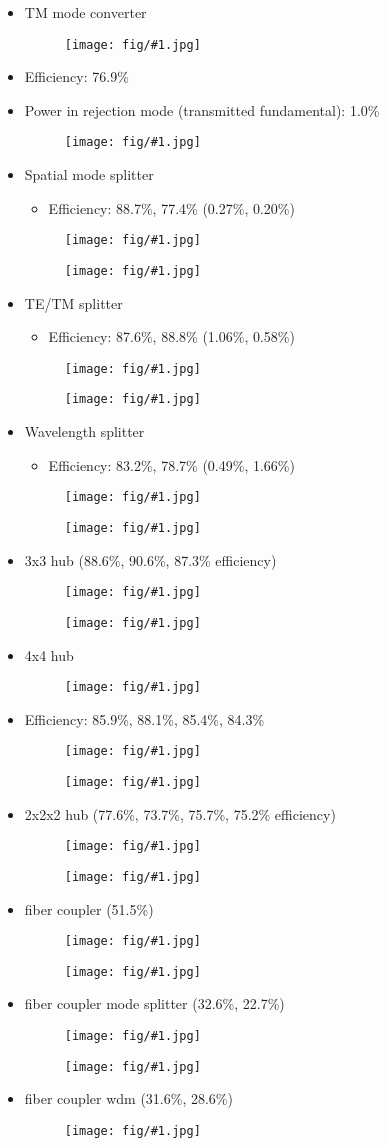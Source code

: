\documentclass[landscape]{foils}
\newcommand{\nextpage}{\vfill\newpage}
\newcommand{\smallfig}[1]{
    \begin{figure}[!h]
    \centerline{\texttt{[image: fig/\#1.jpg]}}
    \end{figure}
}
\newcommand{\medfig}[1]{
    \begin{figure}[!h]
    \centerline{\texttt{[image: fig/\#1.jpg]}}
    \end{figure}
}
\newcommand{\bigfig}[1]{
    \begin{figure}[!h]
    \centerline{\texttt{[image: fig/\#1.jpg]}}
    \end{figure}
}
\newcommand{\BI}{\begin{itemize}\item}
\newcommand{\I}{\item}
\newcommand{\EI}{\end{itemize}}
\begin{document}
\begin{itemize}
\I TM mode converter
\smallfig{wgc_tm}
\I  Efficiency: 76.9\%
\I  Power in rejection mode (transmitted fundamental): 1.0\%
\newpage

\medfig{3D_spl_modal}
\nextpage

\I  Spatial mode splitter
\BI  Efficiency: 88.7\%, 77.4\% (0.27\%, 0.20\%) \EI
\medfig{spl_modal}
\newpage

\medfig{3D_spl_tetm}
\nextpage

\I  TE/TM splitter
\BI  Efficiency: 87.6\%, 88.8\% (1.06\%, 0.58\%) \EI
\medfig{spl_tetm}
\newpage

\medfig{3D_spl_wdm}
\nextpage

\I  Wavelength splitter
\BI  Efficiency: 83.2\%, 78.7\% (0.49\%, 1.66\%) \EI
\medfig{spl_wdm}
\newpage

\medfig{3D_hub_3x3}
\nextpage

\I 3x3 hub (88.6\%, 90.6\%, 87.3\% efficiency)
\bigfig{hub_3x3}
\newpage

\medfig{3D_hub_4x4}
\nextpage

\I 4x4 hub
\bigfig{hub_4x4_eps}
\newpage

\I Efficiency: 85.9\%, 88.1\%, 85.4\%, 84.3\%
\bigfig{hub_4x4}
\newpage

\medfig{3D_hub_2x2x2}
\nextpage

\I 2x2x2 hub (77.6\%, 73.7\%, 75.7\%, 75.2\% efficiency)
\bigfig{hub_2x2x2}
\newpage

\medfig{3D_fib_te}
\nextpage

\I fiber coupler (51.5\%)
\medfig{fib_te}
\newpage

\medfig{3D_fib_pol}
\nextpage

\I fiber coupler mode splitter (32.6\%, 22.7\%)
\bigfig{fib_pol}
\newpage

\medfig{3D_fib_wdm}
\nextpage

\I fiber coupler wdm (31.6\%, 28.6\%)
\bigfig{fib_wdm}
\newpage
\EI
\end{document}
